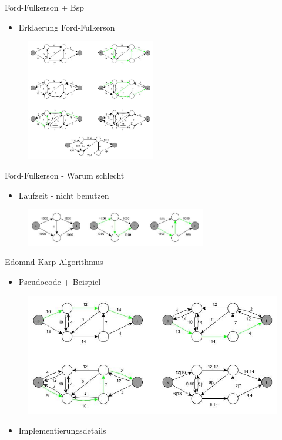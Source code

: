 \documentclass[18pt]{beamer}
\begin{document}
\begin{frame}{Ford-Fulkerson + Bsp}
	\begin{itemize}
		\item Erklaerung Ford-Fulkerson
	\end{itemize}
	\begin{figure}
		\includegraphics[width = 0.5\textwidth]{img/Jakob_Ford.jpg}
	\end{figure}
\end{frame}


\begin{frame}{Ford-Fulkerson - Warum schlecht}
	\begin{itemize}
		\item Laufzeit - nicht benutzen
	\end{itemize}
	\begin{figure}
		\includegraphics[width = 0.7\textwidth]{img/Jakob_Ford2.jpg}
	\end{figure}
\end{frame}


\begin{frame}{Edomnd-Karp Algorithmus}
	\begin{itemize}
		\item Pseudocode + Beispiel
	\end{itemize}
	\begin{figure}
		\includegraphics[width = \textwidth]{img/Jakob_Edmond.jpg}
	\end{figure}
	
	\begin{itemize}
		\item Implementierungsdetails
	\end{itemize}
\end{frame}
\end{document}
